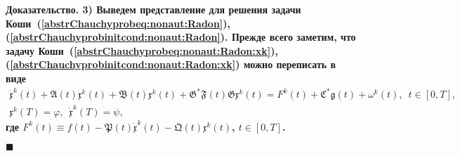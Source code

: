 \documentclass{report}
\newenvironment{Proof}{\par\noindent\bf Доказательство.\rm}{ $\blacksquare$\par}
\begin{document}
\begin{Proof}
3) Выведем представление для решения задачи Коши~(\ref{abstrChauchyprobeq:nonaut:Radon}), (\ref{abstrChauchyprobinitcond:nonaut:Radon}). Прежде всего заметим, что задачу Коши~(\ref{abstrChauchyprobeq:nonaut:Radon:xk}), (\ref{abstrChauchyprobinitcond:nonaut:Radon:xk}) можно переписать в виде 
\begin{gather}\label{abstrChauchyprobeq:nonaut:Radon:xk.1}
\ddot{\mathfrak{x}}^k(t)+\mathfrak{A}(t){\mathfrak{x}}^k(t)+\mathfrak{B}(t){\mathfrak{x}}^k(t) +  \mathfrak{G}^*\mathfrak{F}(t)\mathfrak{G}{\mathfrak{x}}^k(t) = F^k(t)+ \mathfrak{C}^*\mathfrak{g}(t)+\omega^k(t),\,\,\,t\in[0,T],\\
\label{abstrChauchyprobinitcond:nonaut:Radon:xk.1}
{\mathfrak{x}}^k(T)=\varphi,\,\,\,\dot{\mathfrak{x}}^k(T)=\psi,
\end{gather}
где $F^k(t)\equiv f(t) - \mathfrak{P}(t)\dot{\mathfrak{x}}^k(t) - \mathfrak{Q}(t){\mathfrak{x}}^k(t)$, $t\in[0,T]$.


\end{Proof}
\end{document}
